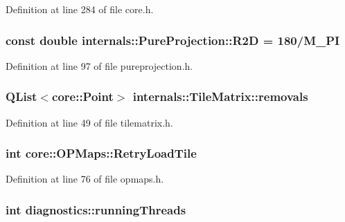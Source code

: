 \-Definition at line 284 of file core.\-h.

\hypertarget{group___o_p_map_widget_ga112e42b7b86260ce042d7c14b4ece2b7}{
\subsubsection[{\-R2\-D}]{\setlength{\rightskip}{0pt plus 5cm}const double {\bf internals\-::\-Pure\-Projection\-::\-R2\-D} = 180/\-M\-\_\-\-P\-I}}\label{group___o_p_map_widget_ga112e42b7b86260ce042d7c14b4ece2b7}


\-Definition at line 97 of file pureprojection.\-h.

\hypertarget{group___o_p_map_widget_gaba9b5e3cf2e51b2a87c5a343968573e9}{
\subsubsection[{removals}]{\setlength{\rightskip}{0pt plus 5cm}\-Q\-List$<${\bf core\-::\-Point}$>$ {\bf internals\-::\-Tile\-Matrix\-::removals}}}\label{group___o_p_map_widget_gaba9b5e3cf2e51b2a87c5a343968573e9}


\-Definition at line 49 of file tilematrix.\-h.

\hypertarget{group___o_p_map_widget_ga21cb35ff34ca1e5eccfe7a0c8f054933}{
\subsubsection[{\-Retry\-Load\-Tile}]{\setlength{\rightskip}{0pt plus 5cm}int {\bf core\-::\-O\-P\-Maps\-::\-Retry\-Load\-Tile}}}\label{group___o_p_map_widget_ga21cb35ff34ca1e5eccfe7a0c8f054933}


\-Definition at line 76 of file opmaps.\-h.

\hypertarget{group___o_p_map_widget_gae7dc693c162396310de691f67b4b0e99}{
\subsubsection[{running\-Threads}]{\setlength{\rightskip}{0pt plus 5cm}int {\bf diagnostics\-::running\-Threads}}}\label{group___o_p_map_widget_gae7dc693c162396310de691f67b4b0e99}


